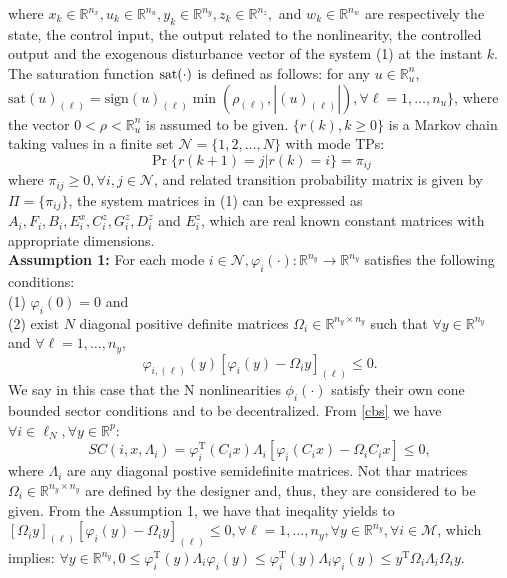 \documentclass[conference]{IEEEtran}
\begin{document}
where $ x_k\in\mathbb{R}^{n_x}, u_k\in\mathbb{R}^{n_u}, y_k\in\mathbb{R}^{n_y}, z_k\in\mathbb{R}^{n_z},$ and $ w_k\in\mathbb{R}^{n_w}$ are respectively the state, the control input, the output related to the nonlinearity, the controlled output and the exogenous disturbance vector of the system (1) at the instant $k$. The saturation function $\rm{sat}(\cdot)$ is defined as follows: for any $u\in\mathbb{R}^n_u$, $\mathrm{sat}(u)_{(\ell)}=\mathrm{sign}(u)_{(\ell)} \min(\rho_{(\ell)},|(u)_{(\ell)}|),\forall\ell=1,\dots,n_u\}$, where the vector $0<\rho<\mathbb{R}^n_u$ is assumed to be given. $\{r(k),k\geq0\}$ is a Markov chain taking values in a finite set $\mathcal{N}=\{1,2,\dots,N\}$ with mode TPs:
\begin{equation}
	\Pr\{r(k+1)=j|r(k)=i\}=\pi_{ij}
\end{equation}
where $\pi_{ij}\geq0,\forall i,j\in\mathcal{N}$, and related transition probability matrix is given by $\mathit{\Pi}=\{\pi_{ij}\}$, the system matrices in (1) can be expressed as $A_i,F_i,B_i,E^x_i,C^z_i,G^z_i,D^z_i$ and $E^z_i$, which are real known constant matrices with appropriate dimensions.
\\
\textbf{Assumption 1:\label{assumption1} } For each mode $i\in\mathcal{N}, \varphi_i(\cdot):\mathbb{R}^{n_y}\rightarrow\mathbb{R}^{n_y} $ satisfies the following conditions:\\
(1) $\varphi_i(0)=0$ and \\
(2) exist $N$ diagonal positive definite matrices $\varOmega_i\in\mathbb{R}^{n_y\times n_y}$ such that $\forall y\in\mathbb{R}^{n_y}$ and $\forall \ell =1,\dots,n_y$,
\begin{equation}\label{cbs}
\varphi_{i,(\ell)}(y)[\varphi_i(y)-\varOmega_iy ]_{(\ell)}\leq 0.
\end{equation}
We say in this case that the N nonlinearities $\phi_i(\cdot) $ satisfy their own cone bounded sector conditions and to be decentralized. From \eqref{cbs} we have $\forall i\in\ell_N,\forall y\in\mathbb{R}^p$:
\begin{equation}\label{scieq}
SC(i,x,\Lambda_i)=\varphi_i^{\mathrm{T}}(C_ix)\varLambda_i[\varphi_i(C_ix)-\varOmega_iC_ix]\leq0,
\end{equation}
where $\varLambda_i$ are any diagonal postive semidefinite matrices. Not thar matrices $\varOmega_i \in \mathbb{R}^{n_y\times n_y}$ are defined by the designer and, thus, they are considered to be given. From the Assumption 1, we have that ineqality \label{scieq} yields to $[\varOmega_iy]_{(\ell)}[\varphi_i(y)-\varOmega_iy]_{(\ell)}\leq0, \forall\ell=1,\dots,n_y, \forall y\in\mathbb{R}^{n_y}, \forall i \in \mathcal{M} $, which implies: $\forall y \in \mathbb{R}^{n_y}, 0\leq\varphi^{\mathrm{T}}_i(y)\Lambda_i\varphi_i(y) \leq \varphi^{\mathrm{T}}_i(y)\varLambda_i\varphi_i(y) \leq y^{\mathrm{T}}\varOmega_i\varLambda_i\varOmega_iy$.
\end{document}
